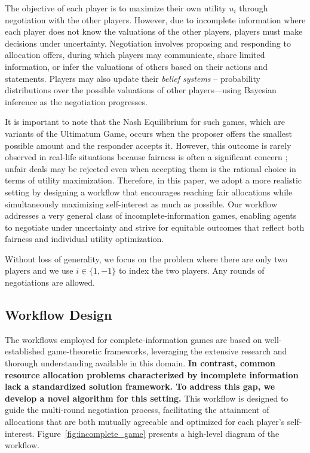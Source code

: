 The objective of each player is to maximize their own utility $u_i$ through negotiation with the other players. However, due to incomplete information where each player does not know the valuations of the other players, players must make decisions under uncertainty. Negotiation involves proposing and responding to allocation offers, during which players may communicate, share limited information, or infer the valuations of others based on their actions and statements. Players may also update their \emph{belief systems} -- probability distributions over the possible valuations of other players—using Bayesian inference as the negotiation progresses.

It is important to note that the Nash Equilibrium for such games, which are variants of the Ultimatum Game, occurs when the proposer offers the smallest possible amount and the responder accepts it. However, this outcome is rarely observed in real-life situations because fairness is often a significant concern \cite{nowak2000fairness}; unfair deals may be rejected even when accepting them is the rational choice in terms of utility maximization. Therefore, in this paper, we adopt a more realistic setting by designing a workflow that encourages reaching fair allocations while simultaneously maximizing self-interest as much as possible. Our workflow addresses a very general class of incomplete-information games, enabling agents to negotiate under uncertainty and strive for equitable outcomes that reflect both fairness and individual utility optimization.

Without loss  of generality, we focus on the problem where there are only two players and we use $i\in\{1, -1\}$ to index the two players. Any rounds of negotiations are allowed.

\subsection{Workflow Design}
\label{sec:incomplete_workflow}
The workflows employed for complete-information games are based on well-established game-theoretic frameworks, leveraging the extensive research and thorough understanding available in this domain. \textbf{In contrast, common resource allocation problems characterized by incomplete information lack a standardized solution framework. To address this gap, we develop a novel algorithm for this setting.} This workflow is designed to guide the multi-round negotiation process, facilitating the attainment of allocations that are both mutually agreeable and optimized for each player’s self-interest. Figure~\ref{fig:incomplete_game} presents a high-level diagram of the workflow.


